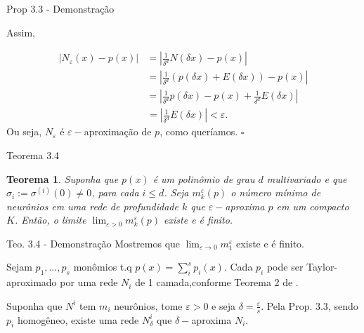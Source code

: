 \documentclass{beamer}
\newtheorem{teo}{Teorema}[section]
\theoremstyle{definition}
\begin{document}
\begin{frame}{Prop 3.3 - Demonstração}

    Assim,

    \begin{align*}
        | N_\varepsilon(x) - p(x) | &= |\frac{1}{\delta^d} N(\delta x) - p(x)| \\
        &= |\frac{1}{\delta^d}(p(\delta x) + E(\delta x))-p(x)| \\
        &=|\frac{1}{\delta^d}p(\delta x) -p(x) + \frac{1}{\delta^d}E(\delta x) |
    \end{align*} \pause
    \begin{align*}
        &= |\frac{1}{\delta^d}E(\delta x)| < \varepsilon.
    \end{align*}
    Ou seja, $N_\varepsilon$ é $\varepsilon-$aproximação de $p$, como queríamos. $\square$
\end{frame}

\begin{frame}{Teorema 3.4}
    \begin{teo}
        Suponha que $p(x)$ é um polinômio de grau $d$ multivariado e que $\sigma_i := \sigma^{(i)}(0) \neq 0$, para cada $i\leq d$. Seja $m_k^\varepsilon(p)$ o número mínimo de neurônios em uma rede de profundidade $k$ que $\varepsilon-$aproxima $p$ em um compacto $K$. \pause 
        \vspace{1em}
        Então, o limite $\lim_{\varepsilon>0}m_k^\varepsilon(p)$ existe e é finito. 
    \end{teo}
\end{frame}

\begin{frame}{Teo. 3.4 - Demonstração}    
    Mostremos que $\lim_{\varepsilon \to 0} m_1^\varepsilon$ existe e é finito. \pause \vspace{1em}

    Sejam $p_1, \dots, p_s$ monômios t.q $p(x) = \sum_i^s p_i(x)$. Cada $p_i$ pode ser Taylor-aproximado por uma rede $N_i$ de 1 camada,conforme Teorema 2 de . 

    \pause
    \vspace{1em}

    Suponha que $N^i$ tem $m_i$ neurônios, tome $\varepsilon>0$ e seja $\delta = \frac{\varepsilon}{s}$. Pela Prop. 3.3, sendo $p_i$ homogêneo, existe uma rede $N^i_\delta$ que $\delta-$aproxima $N_i$.

    \pause
\end{frame}
\end{document}
